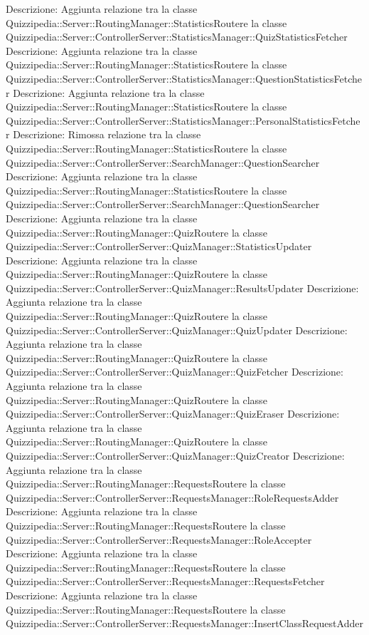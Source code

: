 Descrizione: Aggiunta relazione tra la classe Quizzipedia::Server::RoutingManager::StatisticsRoutere la classe Quizzipedia::Server::ControllerServer::StatisticsManager::QuizStatisticsFetcher 
Descrizione: Aggiunta relazione tra la classe Quizzipedia::Server::RoutingManager::StatisticsRoutere la classe Quizzipedia::Server::ControllerServer::StatisticsManager::QuestionStatisticsFetcher 
Descrizione: Aggiunta relazione tra la classe Quizzipedia::Server::RoutingManager::StatisticsRoutere la classe Quizzipedia::Server::ControllerServer::StatisticsManager::PersonalStatisticsFetcher 
Descrizione: Rimossa relazione tra la classe Quizzipedia::Server::RoutingManager::StatisticsRoutere la classe Quizzipedia::Server::ControllerServer::SearchManager::QuestionSearcher 
Descrizione: Aggiunta relazione tra la classe Quizzipedia::Server::RoutingManager::StatisticsRoutere la classe Quizzipedia::Server::ControllerServer::SearchManager::QuestionSearcher 
Descrizione: Aggiunta relazione tra la classe Quizzipedia::Server::RoutingManager::QuizRoutere la classe Quizzipedia::Server::ControllerServer::QuizManager::StatisticsUpdater 
Descrizione: Aggiunta relazione tra la classe Quizzipedia::Server::RoutingManager::QuizRoutere la classe Quizzipedia::Server::ControllerServer::QuizManager::ResultsUpdater 
Descrizione: Aggiunta relazione tra la classe Quizzipedia::Server::RoutingManager::QuizRoutere la classe Quizzipedia::Server::ControllerServer::QuizManager::QuizUpdater 
Descrizione: Aggiunta relazione tra la classe Quizzipedia::Server::RoutingManager::QuizRoutere la classe Quizzipedia::Server::ControllerServer::QuizManager::QuizFetcher 
Descrizione: Aggiunta relazione tra la classe Quizzipedia::Server::RoutingManager::QuizRoutere la classe Quizzipedia::Server::ControllerServer::QuizManager::QuizEraser 
Descrizione: Aggiunta relazione tra la classe Quizzipedia::Server::RoutingManager::QuizRoutere la classe Quizzipedia::Server::ControllerServer::QuizManager::QuizCreator 
Descrizione: Aggiunta relazione tra la classe Quizzipedia::Server::RoutingManager::RequestsRoutere la classe Quizzipedia::Server::ControllerServer::RequestsManager::RoleRequestsAdder 
Descrizione: Aggiunta relazione tra la classe Quizzipedia::Server::RoutingManager::RequestsRoutere la classe Quizzipedia::Server::ControllerServer::RequestsManager::RoleAccepter 
Descrizione: Aggiunta relazione tra la classe Quizzipedia::Server::RoutingManager::RequestsRoutere la classe Quizzipedia::Server::ControllerServer::RequestsManager::RequestsFetcher 
Descrizione: Aggiunta relazione tra la classe Quizzipedia::Server::RoutingManager::RequestsRoutere la classe Quizzipedia::Server::ControllerServer::RequestsManager::InsertClassRequestAdder 

